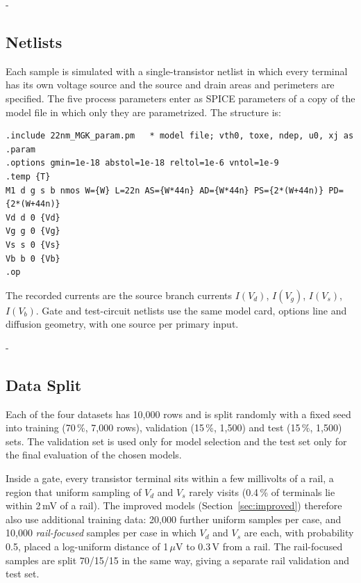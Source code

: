 \documentclass[12pt, a4paper]{article}
\makeatletter
\newcommand{\keepspace}[1]{\par\begingroup
  \setlength{\dimen@}{#1}%
  \dimen@ii\pagegoal \advance\dimen@ii-\pagetotal
  \ifdim\dimen@>\dimen@ii
    \ifdim\dimen@ii>\z@ \vfil\fi
    \break
  \fi\endgroup}
\makeatother
\begin{document}
\keepspace{220pt}
\subsection{Netlists}
\noindent Each sample is simulated with a single-transistor netlist in which every terminal has its own voltage source and the source and drain areas and perimeters are specified. The five process parameters enter as SPICE parameters of a copy of the model file in which only they are parametrized. The structure is:

\noindent\begin{minipage}{\linewidth}
\begin{lstlisting}
.include 22nm_MGK_param.pm   * model file; vth0, toxe, ndep, u0, xj as .param
.options gmin=1e-18 abstol=1e-18 reltol=1e-6 vntol=1e-9
.temp {T}
M1 d g s b nmos W={W} L=22n AS={W*44n} AD={W*44n} PS={2*(W+44n)} PD={2*(W+44n)}
Vd d 0 {Vd}
Vg g 0 {Vg}
Vs s 0 {Vs}
Vb b 0 {Vb}
.op
\end{lstlisting}
\end{minipage}

\noindent The recorded currents are the source branch currents $I(V_d)$, $I(V_g)$, $I(V_s)$, $I(V_b)$. Gate and test-circuit netlists use the same model card, options line and diffusion geometry, with one source per primary input.

\keepspace{14\baselineskip}
\subsection{Data Split}
\noindent Each of the four datasets has 10,000 rows and is split randomly with a fixed seed into training (70\,\%, 7,000 rows), validation (15\,\%, 1,500) and test (15\,\%, 1,500) sets. The validation set is used only for model selection and the test set only for the final evaluation of the chosen models.

\medskip
\noindent Inside a gate, every transistor terminal sits within a few millivolts of a rail, a region that uniform sampling of $V_d$ and $V_s$ rarely visits (0.4\,\% of terminals lie within 2\,mV of a rail). The improved models (Section~\ref{sec:improved}) therefore also use additional training data: 20,000 further uniform samples per case, and 10,000 \emph{rail-focused} samples per case in which $V_d$ and $V_s$ are each, with probability 0.5, placed a log-uniform distance of 1\,$\mu$V to 0.3\,V from a rail. The rail-focused samples are split 70/15/15 in the same way, giving a separate rail validation and test set.
\end{document}
